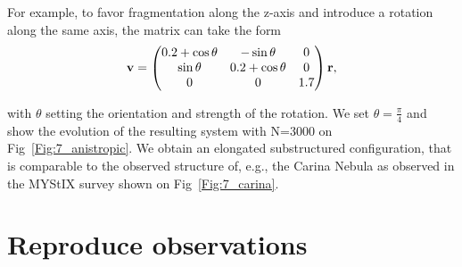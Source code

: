For example, to favor fragmentation along the z-axis and introduce a rotation along the same axis, the matrix can take the form
\begin{equation}
\bold{v} = \left(\begin{matrix}
0.2 + \cos \theta &  -\sin \theta & 0\\
\sin \theta & 0.2 + \cos \theta & 0 \\
0  & 0 & 1.7\\
\end{matrix}\right) \bold{r},
\end{equation}

with $\theta$ setting the orientation and strength of the rotation. We set $\theta = \frac{\pi}{4}$ and show the evolution of the resulting system with N=3000 on Fig~\ref{Fig:7_anistropic}. We obtain an elongated substructured configuration, that is comparable to the observed structure of, e.g., the Carina Nebula as observed in the MYStIX survey \citep{Kuhn2014} shown on Fig~\ref{Fig:7_carina}.



\section{Reproduce observations}






